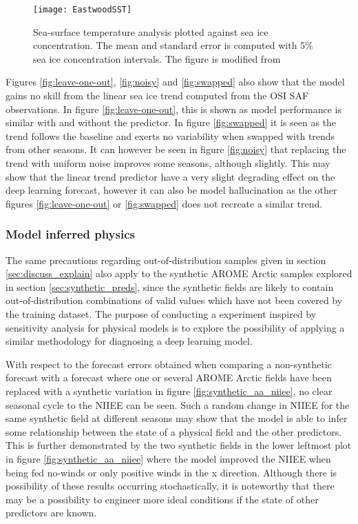 \documentclass[../main/thesis]{subfiles}
\begin{document}
\begin{figure}[h]
    \centering
    \texttt{[image: EastwoodSST]}
    \caption{\label{fig:sst-uncertain}Sea-surface temperature analysis plotted against sea ice concentration. The mean and standard error is computed with 5\% sea ice concentration intervals. The figure is modified from \protect\citet{Castro2023}}
\end{figure}

Figures \ref{fig:leave-one-out}, \ref{fig:noisy} and \ref{fig:swapped} also show that the model gains no skill from the linear sea ice trend computed from the OSI SAF observations. In figure \ref{fig:leave-one-out}, this is shown as model performance is similar with and without the predictor. In figure \ref{fig:swapped} it is seen as the trend follows the baseline and exerts no variability when swapped with trends from other seasons. It can however be seen in figure \ref{fig:noisy} that replacing the trend with uniform noise improves some seasons, although slightly. This may show that the linear trend predictor have a very slight degrading effect on the deep learning forecast, however it can also be model hallucination as the other figures \ref{fig:leave-one-out} or \ref{fig:swapped} does not recreate a similar trend.

\subsubsection{Model inferred physics}
\label{sec:discuss_model_inferred_phys}
The same precautions regarding out-of-distribution samples given in section \ref{sec:discuss_explain} also apply to the synthetic AROME Arctic samples explored in section \ref{sec:synthetic_preds}, since the synthetic fields are likely to contain out-of-distribution combinations of valid values which have not been covered by the training dataset. The purpose of conducting a experiment inspired by sensitivity analysis for physical models is to explore the possibility of applying a similar methodology for diagnosing a deep learning model.

With respect to the forecast errors obtained when comparing a non-synthetic forecast with a forecast where one or several AROME Arctic fields have been replaced with a synthetic variation in figure \ref{fig:synthetic_aa_niiee}, no clear seasonal cycle to the NIIEE can be seen. Such a random change in NIIEE for the same synthetic field at different seasons may show that the model is able to infer some relationship between the state of a physical field and the other predictors. This is further demonstrated by the two synthetic fields in the lower leftmost plot in figure \ref{fig:synthetic_aa_niiee} where the model improved the NIIEE when being fed no-winds or only positive winds in the x direction. Although there is possibility of these results occurring stochastically, it is noteworthy that there may be a possibility to engineer more ideal conditions if the state of other predictors are known.
\end{document}
